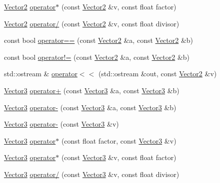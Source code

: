 \begin{DoxyCompactItemize}
\item 
\hyperlink{classprism_1_1_vector2}{Vector2} \hyperlink{namespaceprism_a1de3bc1dbc3fd33f26d580bce3520854}{operator$\ast$} (const \hyperlink{classprism_1_1_vector2}{Vector2} \&v, const float factor)
\item 
\hyperlink{classprism_1_1_vector2}{Vector2} \hyperlink{namespaceprism_aea1ab02785c9d4d5ea560face252b75e}{operator/} (const \hyperlink{classprism_1_1_vector2}{Vector2} \&v, const float divisor)
\item 
const bool \hyperlink{namespaceprism_a311fc983ec89876189643e840d781974}{operator==} (const \hyperlink{classprism_1_1_vector2}{Vector2} \&a, const \hyperlink{classprism_1_1_vector2}{Vector2} \&b)
\item 
const bool \hyperlink{namespaceprism_a7e9d0b027a9e7d9e313affe5af91dabc}{operator!=} (const \hyperlink{classprism_1_1_vector2}{Vector2} \&a, const \hyperlink{classprism_1_1_vector2}{Vector2} \&b)
\item 
std\+::ostream \& \hyperlink{namespaceprism_a4616180b97f4288a3b3e28304efee020}{operator$<$$<$} (std\+::ostream \&out, const \hyperlink{classprism_1_1_vector2}{Vector2} \&v)
\item 
\hyperlink{classprism_1_1_vector3}{Vector3} \hyperlink{namespaceprism_a7ac90b31f235390d6feb818e3f88ecf0}{operator+} (const \hyperlink{classprism_1_1_vector3}{Vector3} \&a, const \hyperlink{classprism_1_1_vector3}{Vector3} \&b)
\item 
\hyperlink{classprism_1_1_vector3}{Vector3} \hyperlink{namespaceprism_a3beb56b334423e027f1ab185785695f8}{operator-\/} (const \hyperlink{classprism_1_1_vector3}{Vector3} \&a, const \hyperlink{classprism_1_1_vector3}{Vector3} \&b)
\item 
\hyperlink{classprism_1_1_vector3}{Vector3} \hyperlink{namespaceprism_a8f7cf835ff415e187e6881169803f502}{operator-\/} (const \hyperlink{classprism_1_1_vector3}{Vector3} \&v)
\item 
\hyperlink{classprism_1_1_vector3}{Vector3} \hyperlink{namespaceprism_a429cccc5eee454ba019045afb4a01e93}{operator$\ast$} (const float factor, const \hyperlink{classprism_1_1_vector3}{Vector3} \&v)
\item 
\hyperlink{classprism_1_1_vector3}{Vector3} \hyperlink{namespaceprism_aa1f2f6de8bf1b584cbb82062a607e167}{operator$\ast$} (const \hyperlink{classprism_1_1_vector3}{Vector3} \&v, const float factor)
\item 
\hyperlink{classprism_1_1_vector3}{Vector3} \hyperlink{namespaceprism_a87e022748076586917c38e83430df284}{operator/} (const \hyperlink{classprism_1_1_vector3}{Vector3} \&v, const float divisor)

\end{DoxyCompactItemize}
